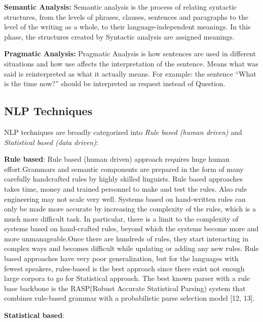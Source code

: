 \documentclass[sigconf]{acmart}
\begin{document}
\par\null\par
\textbf{Semantic Analysis:}
     Semantic analysis is the process of relating syntactic structures, from the levels of phrases, clauses, sentences and paragraphs to the level of the writing as a whole, to their language-independent meanings. In this phase, the structures created by Syntactic analysis are assigned meanings.
\par\null\par
\textbf{Pragmatic Analysis:}
     Pragmatic Analysis is how sentences are used in different situations and how use affects the interpretation of the sentence. Means what was said is reinterpreted as what it actually means. For example: the sentence ``What is the time now?'' should be interpreted as request instead of Question.
\subsection{NLP Techniques}
NLP techniques are broadly categorized into \textit{Rule based (human driven)} and \textit{Statistical based (data driven)}:
\par\null\par
\textbf{Rule based}:
   Rule based (human driven) approach requires huge human effort.Grammars and semantic components are prepared in the form of many carefully handcrafted rules by highly skilled linguists. Rule based approaches takes time, money and trained personnel to make and test the rules. Also rule engineering may not scale very well. Systems based on hand-written rules can only be made more accurate by increasing the complexity of the rules, which is a much more difficult task. In particular, there is a limit to the complexity of systems based on hand-crafted rules, beyond which the systems become more and more unmanageable.Once there are hundreds of rules, they start interacting in complex ways and becomes difficult while updating or adding any new rules. Rule based approaches have very poor generalization, but for the languages with fewest speakers, rules-based is the best approach since there exist not enough large corpora to go for Statistical approach. The  best  known  parser  with  a  rule base  backbone is the RASP(Robust Accurate Statistical Parsing) system that combines rule-based grammar with a probabilistic parse selection model [12, 13].
\par\null\par
\textbf{Statistical based}:
\end{document}
